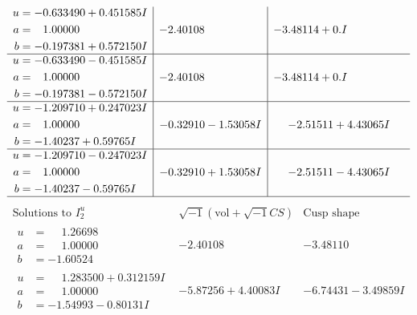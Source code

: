 \documentclass[1p]{elsarticle_modified}
\theoremstyle{definition}
\newcommand{\I}{\sqrt{-1}}
\begin{document}
$$\begin{array}{c|c|c}
\begin{aligned}
u &= -0.633490 + 0.451585 I \\
a &= \phantom{-}1.00000\phantom{ +0.000000I} \\
b &= -0.197381 + 0.572150 I\end{aligned}
 & -2.40108\phantom{ +0.000000I} & -3.48114 + 0. I\phantom{ +0.000000I} \\ \hline\begin{aligned}
u &= -0.633490 - 0.451585 I \\
a &= \phantom{-}1.00000\phantom{ +0.000000I} \\
b &= -0.197381 - 0.572150 I\end{aligned}
 & -2.40108\phantom{ +0.000000I} & -3.48114 + 0. I\phantom{ +0.000000I} \\ \hline\begin{aligned}
u &= -1.209710 + 0.247023 I \\
a &= \phantom{-}1.00000\phantom{ +0.000000I} \\
b &= -1.40237 + 0.59765 I\end{aligned}
 & -0.32910 - 1.53058 I & -2.51511 + 4.43065 I \\ \hline\begin{aligned}
u &= -1.209710 - 0.247023 I \\
a &= \phantom{-}1.00000\phantom{ +0.000000I} \\
b &= -1.40237 - 0.59765 I\end{aligned}
 & -0.32910 + 1.53058 I & -2.51511 - 4.43065 I\\
 \hline 
 \end{array}$$\newpage$$\begin{array}{c|c|c}  
\text{Solutions to }I^u_{2}& \I (\text{vol} + \sqrt{-1}CS) & \text{Cusp shape}\\
 \hline 
\begin{aligned}
u &= \phantom{-}1.26698\phantom{ +0.000000I} \\
a &= \phantom{-}1.00000\phantom{ +0.000000I} \\
b &= -1.60524\phantom{ +0.000000I}\end{aligned}
 & -2.40108\phantom{ +0.000000I} & -3.48110\phantom{ +0.000000I} \\ \hline\begin{aligned}
u &= \phantom{-}1.283500 + 0.312159 I \\
a &= \phantom{-}1.00000\phantom{ +0.000000I} \\
b &= -1.54993 - 0.80131 I\end{aligned}
 & -5.87256 + 4.40083 I & -6.74431 - 3.49859 I \\ \hline\begin{aligned}

\end{aligned}
\end{array}$$
\end{document}
